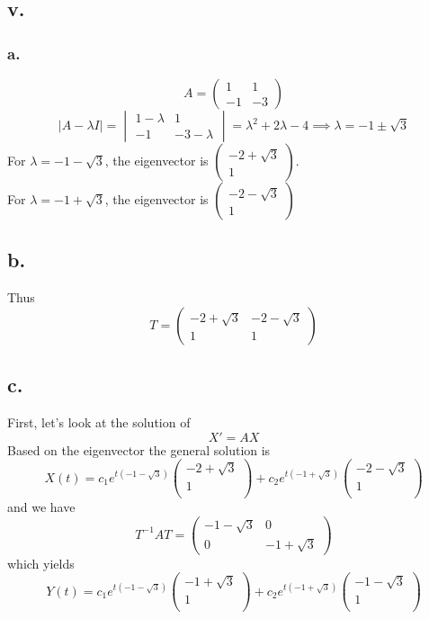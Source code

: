\documentclass[11pt]{article}
\theoremstyle{mystyle}
\theoremstyle{definition}
\begin{document}
\subsection*{v.}
\subsubsection*{a.}
\[
  A = 
  \begin{pmatrix}
    1 & 1 \\
    -1 & -3
  \end{pmatrix}
\]
\[
  |A-\lambda I |= 
  \begin{vmatrix}
    1 - \lambda & 1 \\
    -1 & -3-\lambda
  \end{vmatrix}
  = \lambda^2 + 2\lambda - 4 
  \implies \lambda = -1 \pm \sqrt{3} 
\]
For $\lambda = -1 -\sqrt{3}$, the eigenvector is 
$\begin{pmatrix}
  -2 + \sqrt{3} \\
  1
\end{pmatrix}
$. \\
For $\lambda = -1 + \sqrt{3}$, the eigenvector is 
$\begin{pmatrix}
  -2 - \sqrt{3} \\
  1
\end{pmatrix}
$
\subsection*{b.}
Thus 
\[
  T = 
  \begin{pmatrix}
    -2 + \sqrt{3} & - 2 - \sqrt{3} \\
    1 & 1
  \end{pmatrix}
\]
\subsection*{c.}
First, let's look at the solution of 
\[
  X' = AX
\]
Based on the eigenvector the general solution is 
\[
  X(t) = c_1 e^{t(-1-\sqrt{3})} 
  \begin{pmatrix}
    -2 + \sqrt{3} \\
    1 \\
  \end{pmatrix}
  + c_2 e^{t(-1 + \sqrt{3})}
  \begin{pmatrix}
    -2 - \sqrt{3} \\
    1 \\
  \end{pmatrix}
\]
and we have 
\[
  T^{-1} A T = 
  \begin{pmatrix}
    -1 - \sqrt{3} & 0 \\
    0 & -1 + \sqrt{3} 
  \end{pmatrix}
\]
which yields 
\[
  Y(t) = c_1 e^{t(-1-\sqrt{3})} 
  \begin{pmatrix}
    -1 + \sqrt{3} \\
    1 \\
  \end{pmatrix}
  + c_2 e^{t(-1 + \sqrt{3})}
  \begin{pmatrix}
    -1 - \sqrt{3} \\
    1 \\
  \end{pmatrix}
\]
\end{document}
